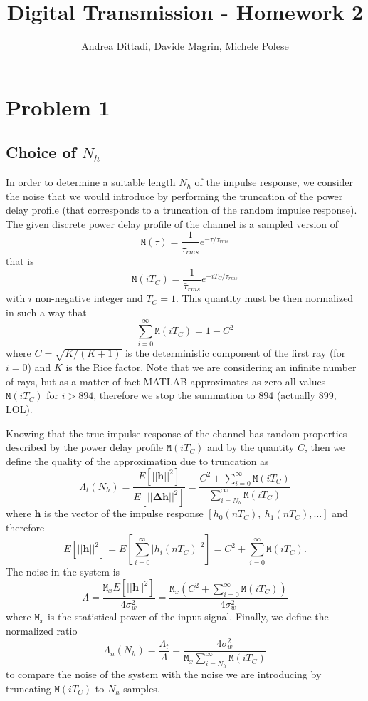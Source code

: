 \documentclass[10pt]{article}
\newcommand{\M} {\mathtt{M}}
\numberwithin{equation}{section}
\begin{document}
\title{Digital Transmission - Homework 2}
\author{Andrea Dittadi, Davide Magrin, Michele Polese}

\maketitle

\section*{Problem 1}

\subsection*{Choice of $N_h$}

In order to determine a suitable length $N_h$ of the impulse response, we consider the noise that we would introduce by performing the truncation of the power delay profile (that corresponds to a truncation of the random impulse response). The given discrete power delay profile of the channel is a sampled version of
$$ \M(\tau) = \frac{1}{\bar{\tau}_{rms}} e^{-\tau / \bar{\tau}_{rms}} $$
that is
$$ \M(iT_C) = \frac{1}{\bar{\tau}_{rms}} e^{-iT_C / \bar{\tau}_{rms}} $$
with $i$ non-negative integer and $T_C = 1$. This quantity must be then normalized in such a way that
$$\sum_{i=0}^{\infty} \M(iT_C) = 1 - C^2 $$
where $C = \sqrt{K / (K+1)}$ is the deterministic component of the first ray (for $i=0$) and $K$ is the Rice factor. Note that we are considering an infinite number of rays, but as a matter of fact MATLAB approximates as zero all values $\M(iT_C)$ for $i > 894$, therefore we stop the summation to 894 (actually 899, LOL). %

Knowing that the true impulse response of the channel has random properties described by the power delay profile $\M(iT_C)$ and by the quantity $C$, then we define the quality of the approximation due to truncation as
$$ \Lambda_t(N_h) = \frac{E[||\mathbf{h}||^2]}{E[||\mathbf{\Delta h}||^2]} = \frac{C^2 + \sum_{i=0}^{\infty} \M(iT_C)}{\sum_{i=N_h}^{\infty} \M(iT_C)} $$
where $\mathbf{h}$ is the vector of the impulse response $[h_0(nT_C),~h_1(nT_C),\ldots]$ and therefore
$$ E[||\mathbf{h}||^2] = E[\sum_{i=0}^{\infty} |h_i(nT_C)|^2] = C^2 + \sum_{i=0}^{\infty} \M(iT_C). $$
The noise in the system is
$$ \Lambda = \frac{\M_x E[||\mathbf{h}||^2]}{4 \sigma_w^2} = \frac{\M_x (C^2 + \sum_{i=0}^{\infty} \M(iT_C))}{4 \sigma_w^2} $$
where $\M_x$ is the statistical power of the input signal. Finally, we define the normalized ratio
$$ \Lambda_n (N_h) = \frac{\Lambda_t}{\Lambda} = \frac{4 \sigma_w^2}{\M_x \sum_{i=N_h}^{\infty} \M(iT_C)} $$
to compare the noise of the system with the noise we are introducing by truncating $\M(iT_C)$ to $N_h$ samples.
\end{document}
